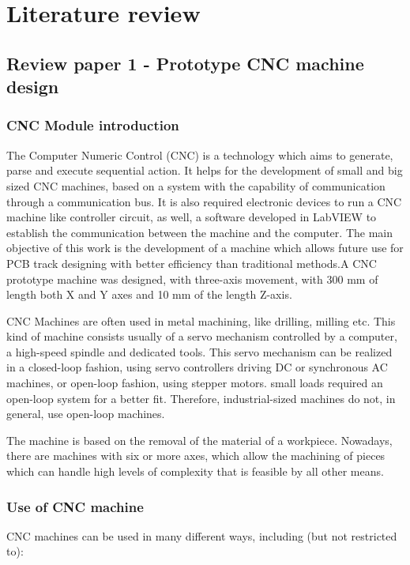 \chapter{Literature review} \label{chapter2}

\section{Review paper 1 - Prototype CNC machine design} 

\subsection{CNC Module introduction}
The Computer Numeric Control (CNC) \cite{ieee_pap} is a technology which aims to generate, parse and execute sequential action. It helps for the development of small and big sized CNC machines, based on a system with the capability of communication through a communication bus. It is also required electronic devices to run a CNC machine like controller circuit, as well, a software developed in LabVIEW to establish the communication between the machine and the computer. The main objective of this work is the development of a machine which allows future use for PCB track designing with better efficiency than traditional methods.A CNC prototype machine was designed, with three-axis movement, with 300 mm of length both X and Y axes and 10 mm of the length Z-axis. \par

CNC Machines are often used in metal machining, like drilling, milling etc. This kind of machine consists usually of a servo mechanism controlled by a computer, a high-speed spindle and dedicated tools. This servo mechanism can be realized in a closed-loop fashion, using servo controllers driving DC or synchronous AC machines, or open-loop fashion, using stepper motors. small loads required an open-loop system for a better fit. Therefore, industrial-sized machines do not, in general, use open-loop machines. \par

The machine is based on the removal of the material of a workpiece. Nowadays, there are machines with six or more axes, which allow the machining of pieces which can handle high levels of complexity that is feasible by all other means.


\subsection{Use of CNC machine}
CNC machines can be used in many different ways, including (but not restricted to):


